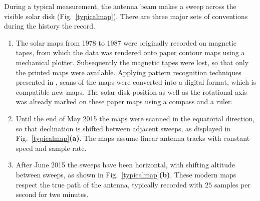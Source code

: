 \documentclass{aa}
\begin{document}
  During a typical measurement, the antenna beam makes a sweep across the
  visible solar disk (Fig.~\ref{typicalmap}). There are three major sets of conventions during the history the record.
  \begin{enumerate}[A]
    \item
    The solar maps from 1978 to 1987 were originally recorded on magnetic
    tapes, from which the data was rendered onto paper contour maps using a
    mechanical plotter.
    Subsequently the magnetic tapes were lost, so that only the printed maps
    were available. Applying pattern recognition techniques presented in \cite{masterthesis}, scans of the maps were converted into
    a digital format, which is compatible new maps.
    The solar disk position as well as the rotational axis was already marked on these paper maps using a compass and a ruler.
    \item
    Until the end of May 2015 the maps were scanned in the equatorial direction,
    so that declination is shifted between adjacent sweeps, as displayed in
    Fig.~\ref{typicalmap}{\bf(a)}.
    The maps assume linear antenna tracks with constant speed and sample rate.
    \item
    After June 2015 the sweeps have been horizontal, with shifting altitude
    between sweeps, as shown in Fig.~\ref{typicalmap}{\bf(b)}.
    These modern maps respect the true path of the antenna, typically recorded
    with $25$ samples per second for two minutes.
  \end{enumerate}
\end{document}
